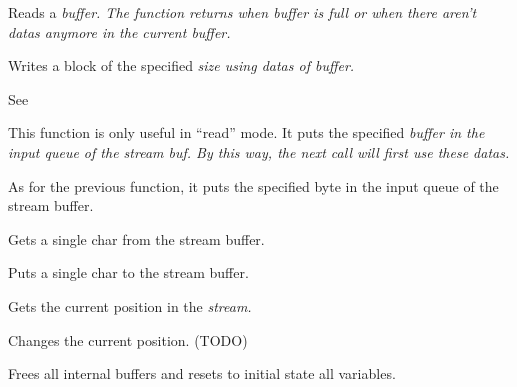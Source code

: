 Reads a \it{buffer}. The function returns when \it{buffer} is full or
when there aren't datas anymore in the current buffer.


Writes a block of the specified \it{size} using datas of \it{buffer}.


See 


This function is only useful in ``read'' mode. It puts the specified \it{buffer}
in the input queue of the stream buf. By this way, the next
 call will first use these datas.


As for the previous function, it puts the specified byte in the input queue of the
stream buffer.


Gets a single char from the stream buffer.


Puts a single char to the stream buffer.


Gets the current position in the \it{stream}.


Changes the current position. (TODO)

 

Frees all internal buffers and resets to initial state all variables.


